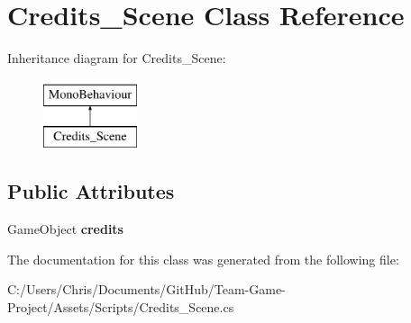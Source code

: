 \hypertarget{class_credits___scene}{}\section{Credits\+\_\+\+Scene Class Reference}
\label{class_credits___scene}
Inheritance diagram for Credits\+\_\+\+Scene\+:\begin{figure}[H]
\begin{center}
\leavevmode
\includegraphics[height=2.000000cm]{class_credits___scene}
\end{center}
\end{figure}
\subsection*{Public Attributes}
\begin{DoxyCompactItemize}
\item 
Game\+Object {\bfseries credits}\hypertarget{class_credits___scene_aae2ce03f67346080cd93885291239725}{}\label{class_credits___scene_aae2ce03f67346080cd93885291239725}

\end{DoxyCompactItemize}


The documentation for this class was generated from the following file\+:\begin{DoxyCompactItemize}
\item 
C\+:/\+Users/\+Chris/\+Documents/\+Git\+Hub/\+Team-\/\+Game-\/\+Project/\+Assets/\+Scripts/Credits\+\_\+\+Scene.\+cs\end{DoxyCompactItemize}
